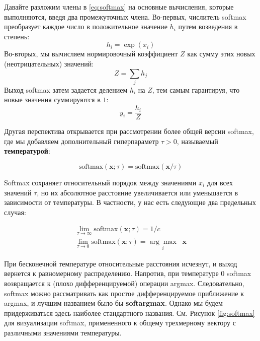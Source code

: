Давайте разложим члены в \eqref{eq:softmax} на основные вычисления, которые выполняются, введя два промежуточных члена. Во-первых, числитель softmax преобразует каждое число в положительное значение $h_i$ путем возведения в степень:
%
\begin{equation}
h_i =\exp(x_i)
\end{equation}
%
Во-вторых, мы вычисляем нормировочный коэффициент $Z$ как сумму этих новых (неотрицательных) значений:
%
\begin{equation}
 Z = \sum_jh_j 
 \end{equation}
%
Выход softmax затем задается делением $h_i$ на $Z$, тем самым гарантируя, что новые значения суммируются в $1$:
%
\begin{equation}
y_i = \frac{h_i}{Z}
\end{equation}

Другая перспектива открывается при рассмотрении более общей версии softmax, где мы добавляем дополнительный гиперпараметр $\tau > 0$, называемый \textbf{температурой}:

$$
\text{softmax}(\mathbf{x};\tau)=\text{softmax}(\mathbf{x}/\tau)
$$

Softmax сохраняет относительный порядок между значениями $x_i$ для всех значений $\tau$, но их абсолютное расстояние увеличивается или уменьшается в зависимости от температуры. В частности, у нас есть следующие два предельных случая:

\begin{gather}
\lim_{\tau \rightarrow \infty} \text{softmax}(\mathbf{x};\tau)=1/c \\
\lim_{\tau \rightarrow 0} \text{softmax}(\mathbf{x};\tau)=\underset{i}{\arg\max} \;\; \mathbf{x}
\end{gather}

При бесконечной температуре относительные расстояния исчезнут, и выход вернется к равномерному распределению. Напротив, при температуре $0$ softmax возвращается к (плохо дифференцируемой) операции argmax. Следовательно, softmax можно рассматривать как простое дифференцируемое приближение к argmax, и лучшим названием было бы \textbf{softargmax}. Однако мы будем придерживаться здесь наиболее стандартного названия. См. Рисунок \ref{fig:softmax} для визуализации softmax, примененного к общему трехмерному вектору с различными значениями температуры.


